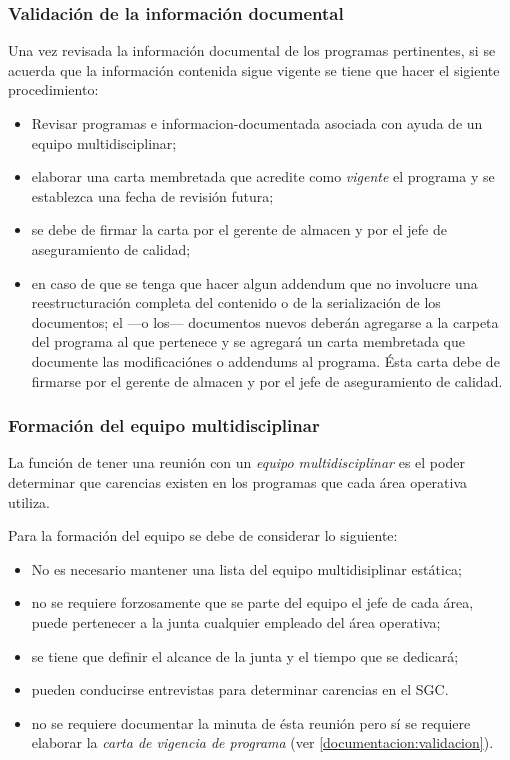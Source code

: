 \subsubsection{Validación de la información documental}
\label{documentacion:validacion}
Una vez revisada la información documental de los programas pertinentes, si se acuerda que la información contenida sigue vigente se tiene que hacer el sigiente procedimiento:
\begin{itemize}
    \item Revisar programas e \gls{informacion-documentada} asociada con ayuda de un equipo multidisciplinar;
    \item elaborar una carta membretada que acredite como \emph{vigente} el programa y se establezca una fecha de revisión futura;
    \item se debe de firmar la carta por el gerente de almacen y por el jefe de aseguramiento de calidad;
    \item en caso de que se tenga que hacer algun addendum que no involucre una reestructuración completa del contenido o de la serialización de los documentos; el ---o los--- documentos nuevos deberán agregarse a la carpeta del programa al que pertenece y se agregará un carta membretada que documente las modificaciónes o addendums al programa. Ésta carta debe de firmarse por el gerente de almacen y por el jefe de aseguramiento de calidad.
\end{itemize}

\subsubsection{Formación del equipo multidisciplinar}
\label{documentacion:formacionEquipo}
La función de tener una reunión con un \emph{equipo multidisciplinar} es el poder determinar que carencias existen en los programas que cada área operativa utiliza.

Para la formación del equipo se debe de considerar lo siguiente:
\begin{itemize}
    \item No es necesario mantener una lista del equipo multidisiplinar estática;
    \item no se requiere forzosamente que se parte del equipo el jefe de cada área, puede pertenecer a la junta cualquier empleado del área operativa;
    \item se tiene que definir el alcance de la junta y el tiempo que se dedicará;
    \item pueden conducirse entrevistas para determinar carencias en el SGC.
    \item no se requiere documentar la minuta de ésta reunión pero sí se requiere elaborar la \emph{carta de vigencia de programa} (ver \cref{documentacion:validacion}).
\end{itemize}



